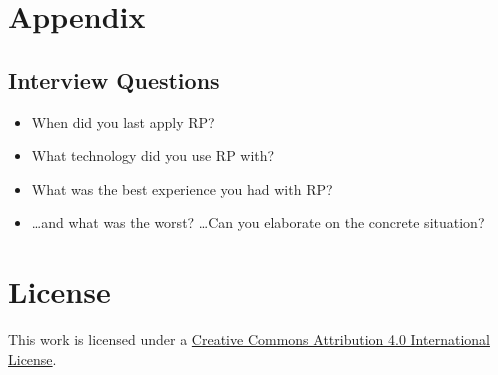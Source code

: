 \documentclass[12pt,a4paper]{article}
\begin{document}
\section{Appendix}

\subsection{Interview Questions}
\label{sec:interviewquestions}

\begin{itemize}
	\item When did you last apply RP?
	\item What technology did you use RP with?
	\item What was the best experience you had with RP?
	\item \dots and what was the worst? \dots Can you elaborate on the concrete situation?
\end{itemize}




\section*{License}
\ccby\thinspace\thinspace This work is licensed under a \href{https://creativecommons.org/licenses/by/4.0/}{Creative Commons Attribution 4.0 International License}.
\end{document}
